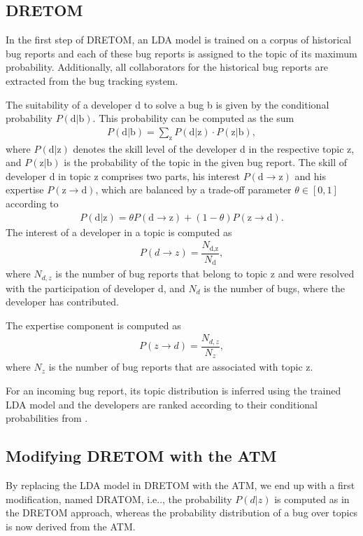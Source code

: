 \documentclass[a4paper,twoside]{article}
\makeatletter
\DeclareRobustCommand\onedot{\futurelet\@let@token\@onedot}
\def\@onedot{\ifx\@let@token.\else.\null\fi\xspace}
\def\ie{i.e\onedot,\xspace}
\makeatother
\begin{document}
\subsection{DRETOM}
In the first step of \ac{DRETOM}, an \ac{LDA} model is trained on a corpus of historical bug reports and each of these bug reports is assigned to the topic of its maximum probability.
Additionally, all collaborators for the historical bug reports are extracted from the bug tracking system.

The suitability of a developer d to solve a bug b is given by the conditional probability $P(\text{d} \vert \text{b})$.
This probability can be computed as the sum
\begin{align}
    P(\text{d} \vert \text{b}) = \sum \limits_{\text{z}} P(\text{d} \vert \text{z}) \cdot P(\text{z} \vert \text{b}), \label{eq:DRETOM}
\end{align}
where $P(\text{d} \vert \text{z})$ denotes the skill level of the developer d in the respective topic z, and $P(\text{z} \vert \text{b})$ is the probability of the topic in the given bug report.
The skill of developer d in topic z comprises two parts, his interest $P(\text{d} \rightarrow \text{z})$ and his expertise $P(\text{z} \rightarrow \text{d})$, which are balanced by a trade-off parameter $\theta \in [0,1]$ according to
\begin{align}
    P(\text{d} \vert \text{z}) = \theta P(\text{d} \rightarrow \text{z}) + (1-\theta) P(\text{z} \rightarrow \text{d}). 
\end{align}
The interest of a developer in a topic is computed as 
\begin{align}
    P(d \rightarrow z) = \dfrac{N_{\text{d,z}}}{N_{\text{d}}},
\end{align}
where $N_{d,z}$ is the number of bug reports that belong to topic z and were resolved with the participation of developer d, and $N_{d}$ is the number of bugs, where the developer has contributed.

The expertise component is computed as
\begin{align}
        P(z \rightarrow d) = \dfrac{N_{d,z}}{N_{z}},
\end{align}
where $N_{z}$ is the number of bug reports that are associated with topic z.

For an incoming bug report, its topic distribution is inferred using the trained \ac{LDA} model and the developers are ranked according to their conditional probabilities from .

\subsection{\texorpdfstring{Modifying \ac{DRETOM} with the \ac{ATM}}{Modifying DRETOM with the ATM}}
\label{ssec:dratom}
By replacing the \ac{LDA} model in \ac{DRETOM} with the \ac{ATM}, we end up with a first modification, named \ac{DRATOM}, \ie the probability $P(d \vert z)$ is computed as in the \ac{DRETOM} approach, whereas the probability distribution of a bug over topics is now derived from the \ac{ATM}.
\end{document}
